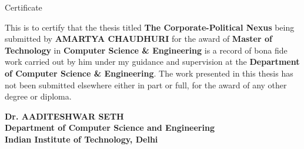 \begin{center}
\LARGE{ Certificate}
\end{center}

\vspace{0.5in}

This is to certify that the thesis titled {\bfseries The Corporate-Political Nexus} being submitted by
{\bfseries AMARTYA CHAUDHURI} for the award of {\bfseries Master of Technology} in {\bfseries Computer Science \& Engineering} is a record of bona fide work carried out by him under my guidance and supervision at the {\bfseries Department of Computer Science \& Engineering}. The work presented in this thesis has not been submitted elsewhere either in part or full, for the award of any other degree or diploma.

\vspace{1.5in}


{\bfseries Dr. AADITESHWAR SETH} \\
{\bfseries Department of Computer Science and Engineering} \\
{\bfseries Indian Institute of Technology, Delhi}\\
